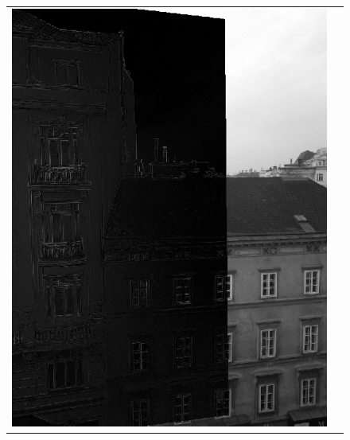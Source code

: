 \setlength {}
\begin{figure}[h]
	\centering
	\begin{tabular}{cc}
	\includegraphics[width=\mywidth]{figures/diff1.png} &

\end{tabular}
\end{figure}
